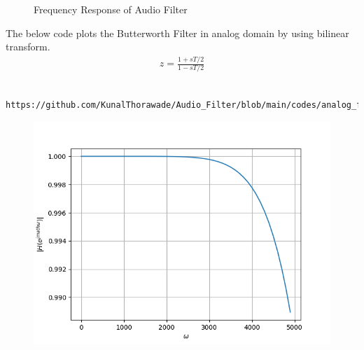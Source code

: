 \documentclass[journal,12pt,twocolumn]{IEEEtran}
\theoremstyle{remark}
\begin{document}
\begin{enumerate}[label=\thesection.\arabic*]
\begin{figure}[H]
																																																																																													\caption{Frequency Response of Audio Filter}
																																																																																													\label{fig:H(w)_6}
																																																																																													\end{figure}
																																																																																													The below code plots the Butterworth Filter in analog domain by using bilinear transform.
																																																																																													\begin{align}
																																																																																													    z=\frac{1+sT/2}{1-sT/2}
																																																																																													    \end{align}
																																																																																													    \begin{lstlisting}
																																																																																													    https://github.com/KunalThorawade/Audio_Filter/blob/main/codes/analog_filt.py
																																																																																													    \end{lstlisting}
																																																																																													    \begin{figure}[H]
																																																																																													    \centering
																																																																																													    \includegraphics[width=1\columnwidth]{figs/Butterworth_analog.png}

\end{figure}
\end{enumerate}
\end{document}
